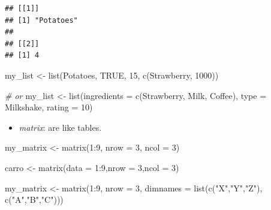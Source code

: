 \documentclass[
]{book}
\newenvironment{Shaded}{\begin{snugshade}}{\end{snugshade}}
\newcommand{\AttributeTok}[1]{\textcolor[rgb]{0.77,0.63,0.00}{#1}}
\newcommand{\CommentTok}[1]{\textcolor[rgb]{0.56,0.35,0.01}{\textit{#1}}}
\newcommand{\ConstantTok}[1]{\textcolor[rgb]{0.00,0.00,0.00}{#1}}
\newcommand{\DecValTok}[1]{\textcolor[rgb]{0.00,0.00,0.81}{#1}}
\newcommand{\FunctionTok}[1]{\textcolor[rgb]{0.00,0.00,0.00}{#1}}
\newcommand{\NormalTok}[1]{#1}
\newcommand{\OtherTok}[1]{\textcolor[rgb]{0.56,0.35,0.01}{#1}}
\newcommand{\SpecialCharTok}[1]{\textcolor[rgb]{0.00,0.00,0.00}{#1}}
\newcommand{\StringTok}[1]{\textcolor[rgb]{0.31,0.60,0.02}{#1}}
\providecommand{\tightlist}{%
  \setlength{\itemsep}{0pt}\setlength{\parskip}{0pt}}
\begin{document}
\begin{verbatim}
## [[1]]
## [1] "Potatoes"
## 
## [[2]]
## [1] 4
\end{verbatim}

\begin{Shaded}
\begin{Highlighting}[]
\NormalTok{my\_list }\OtherTok{\textless{}{-}} \FunctionTok{list}\NormalTok{(}\StringTok{\textquotesingle{}Potatoes\textquotesingle{}}\NormalTok{, }\ConstantTok{TRUE}\NormalTok{, }\DecValTok{15}\NormalTok{, }\FunctionTok{c}\NormalTok{(}\StringTok{\textquotesingle{}Strawberry\textquotesingle{}}\NormalTok{, }\DecValTok{1000}\NormalTok{))}

\CommentTok{\# or}
\NormalTok{my\_list }\OtherTok{\textless{}{-}} \FunctionTok{list}\NormalTok{(}\AttributeTok{ingredients =} \FunctionTok{c}\NormalTok{(}\StringTok{\textquotesingle{}Strawberry\textquotesingle{}}\NormalTok{, }\StringTok{\textquotesingle{}Milk\textquotesingle{}}\NormalTok{, }\StringTok{\textquotesingle{}Coffee\textquotesingle{}}\NormalTok{), }\AttributeTok{type =} \StringTok{\textquotesingle{}Milkshake\textquotesingle{}}\NormalTok{, }\AttributeTok{rating =} \DecValTok{10}\NormalTok{)}
\end{Highlighting}
\end{Shaded}

\begin{itemize}
\tightlist
\item
  \emph{matrix}: are like tables.
\end{itemize}

\begin{Shaded}
\begin{Highlighting}[]
\NormalTok{my\_matrix }\OtherTok{\textless{}{-}} \FunctionTok{matrix}\NormalTok{(}\DecValTok{1}\SpecialCharTok{:}\DecValTok{9}\NormalTok{, }\AttributeTok{nrow =} \DecValTok{3}\NormalTok{, }\AttributeTok{ncol =} \DecValTok{3}\NormalTok{)}

\NormalTok{carro }\OtherTok{\textless{}{-}} \FunctionTok{matrix}\NormalTok{(}\AttributeTok{data =} \DecValTok{1}\SpecialCharTok{:}\DecValTok{9}\NormalTok{,}\AttributeTok{nrow =} \DecValTok{3}\NormalTok{,}\AttributeTok{ncol =} \DecValTok{3}\NormalTok{)}

\NormalTok{my\_matrix }\OtherTok{\textless{}{-}} \FunctionTok{matrix}\NormalTok{(}\DecValTok{1}\SpecialCharTok{:}\DecValTok{9}\NormalTok{, }\AttributeTok{nrow =} \DecValTok{3}\NormalTok{, }\AttributeTok{dimnames =} \FunctionTok{list}\NormalTok{(}\FunctionTok{c}\NormalTok{(}\StringTok{"X"}\NormalTok{,}\StringTok{"Y"}\NormalTok{,}\StringTok{"Z"}\NormalTok{), }\FunctionTok{c}\NormalTok{(}\StringTok{"A"}\NormalTok{,}\StringTok{"B"}\NormalTok{,}\StringTok{"C"}\NormalTok{)))}
\end{Highlighting}
\end{Shaded}
\end{document}
